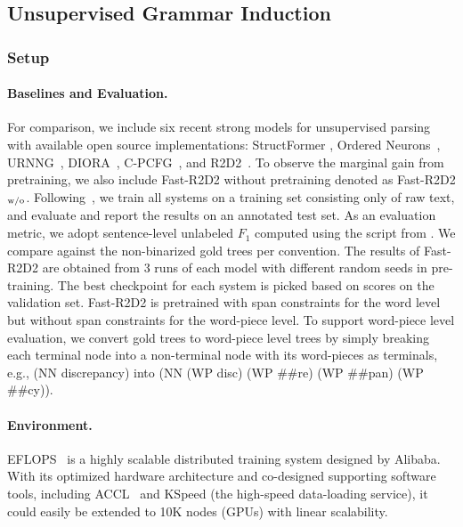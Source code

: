 \subsection{Unsupervised Grammar Induction}

\subsubsection{Setup}\label{sec:LM_setup}
\paragraph{Baselines and Evaluation.} 
For comparison, we include six recent strong models for unsupervised parsing with available open source implementations: StructFormer \cite{DBLP:conf/acl/ShenTZBMC20}, Ordered Neurons~\cite{DBLP:conf/iclr/ShenTSC19}, URNNG~\cite{dblp:conf/naacl/kimrykdm19}, DIORA~\cite{dblp:conf/naacl/drozdovvyim19}, C-PCFG~\cite{kim-etal-2019-compound}, and R2D2~\cite{hu-etal-2021-r2d2}. 
To observe the marginal gain from pretraining, we also include Fast-R2D2 without pretraining denoted as Fast-R2D2$_{\rm w/o}$.
Following~, we train all systems on a training set consisting only of raw text, and evaluate and report the results on an annotated test set. 
As an evaluation metric, we adopt sentence-level unlabeled $F_1$ computed using the script from .
We compare against the non-binarized gold trees per convention.
The results of Fast-R2D2 are obtained from 3 runs of each model with different random seeds in pre-training.
The best checkpoint for each system is picked based on scores on the validation set. 
Fast-R2D2 is pretrained with span constraints for the word level but without span constraints for the word-piece level.
To support word-piece level evaluation, 
we convert gold trees to word-piece level trees 
by simply breaking each terminal node into a non-terminal node with its word-pieces as terminals, e.g., (NN discrepancy) into (NN (WP disc) (WP \#\#re) (WP \#\#pan) (WP \#\#cy)).

\paragraph{Environment.} EFLOPS~\cite{DBLP:conf/hpca/DongCZYWFZLSPGJ20} is a highly scalable distributed training system designed by Alibaba. With its optimized hardware architecture and co-designed supporting software tools, including ACCL~\cite{DBLP:journals/micro/DongWFCPTLLRGGL21} and KSpeed (the high-speed data-loading service), it could easily be extended to 10K nodes (GPUs) with linear scalability.

